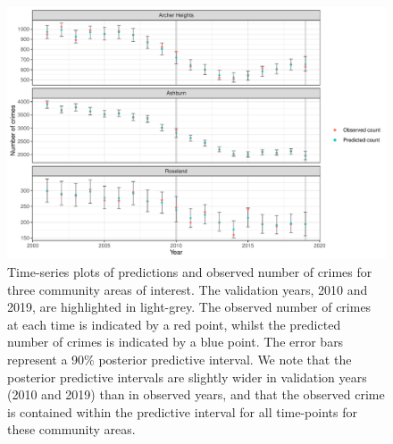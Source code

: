 \documentclass[12pt,a4paper]{article}
\begin{document}
\begin{figure}[t!]
    \centering
    \includegraphics[width = \linewidth]{Images/chicago_time_series.pdf}
    \caption{Time-series plots of predictions and observed number of crimes for three community areas of interest. The validation years, 2010 and 2019, are highlighted in light-grey. The observed number of crimes at each time is indicated by a red point, whilst the predicted number of crimes is indicated by a blue point. The error bars represent a 90\% posterior predictive interval. We note that the posterior predictive intervals are slightly wider in validation years (2010 and 2019) than in observed years, and that the observed crime is contained within the predictive interval for all time-points for these community areas. 
}   
  \label{fig:chicago_time_series}
\end{figure}
\end{document}
